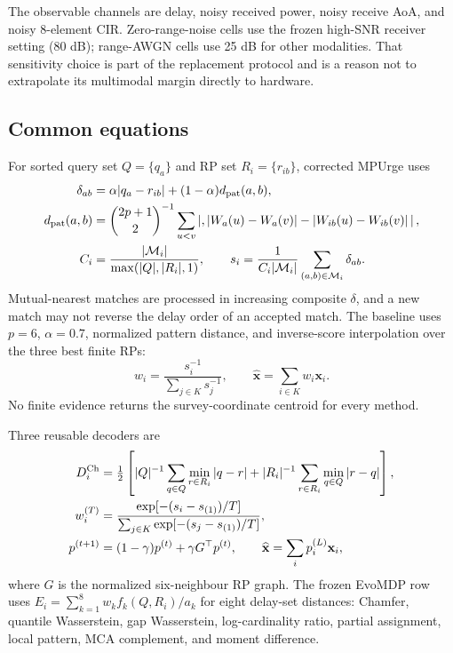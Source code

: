 \documentclass[10pt]{article}
\begin{document}
The observable channels are delay, noisy received power, noisy receive AoA,
and noisy 8-element CIR.  Zero-range-noise cells use the frozen high-SNR
receiver setting (80 dB); range-AWGN cells use 25 dB for other modalities.
That sensitivity choice is part of the replacement protocol and is a reason
not to extrapolate its multimodal margin directly to hardware.

\subsection{Common equations}

For sorted query set $Q=\{q_a\}$ and RP set $R_i=\{r_{ib}\}$, corrected
MPUrge uses
\begin{align}
 \delta_{ab}&=\alpha|q_a-r_{ib}|+(1-\alpha)d_{\rm pat}(a,b),\\
 d_{\rm pat}(a,b)&=\binom{2p+1}{2}^{-1}
 \sum_{u<v}\left|,|W_a(u)-W_a(v)|-|W_{ib}(u)-W_{ib}(v)|\,\right|,\\
 C_i&=\frac{|\mathcal M_i|}{\max(|Q|,|R_i|,1)},\qquad
 s_i=\frac{1}{C_i|\mathcal M_i|}\sum_{(a,b)\in\mathcal M_i}\delta_{ab}.
\end{align}
Mutual-nearest matches are processed in increasing composite $\delta$, and a
new match may not reverse the delay order of an accepted match.  The baseline
uses $p=6$, $\alpha=0.7$, normalized pattern distance, and inverse-score
interpolation over the three best finite RPs:
\begin{equation}
 w_i=\frac{s_i^{-1}}{\sum_{j\in K}s_j^{-1}},\qquad
 \widehat{\mathbf x}=\sum_{i\in K}w_i\mathbf x_i.
\end{equation}
No finite evidence returns the survey-coordinate centroid for every method.

Three reusable decoders are
\begin{align}
 D_i^{\rm Ch}&=\tfrac12\left[|Q|^{-1}\sum_{q\in Q}\min_{r\in R_i}|q-r|
 +|R_i|^{-1}\sum_{r\in R_i}\min_{q\in Q}|r-q|\right],\\
 w_i^{(T)}&=\frac{\exp[-(s_i-s_{(1)})/T]}
 {\sum_{j\in K}\exp[-(s_j-s_{(1)})/T]},\\
 p^{(t+1)}&=(1-\gamma)p^{(t)}+\gamma G^\top p^{(t)},\qquad
 \widehat{\mathbf x}=\sum_i p_i^{(L)}\mathbf x_i,
\end{align}
where $G$ is the normalized six-neighbour RP graph.  The frozen EvoMDP row
uses $E_i=\sum_{k=1}^8w_k f_k(Q,R_i)/a_k$ for eight delay-set distances:
Chamfer, quantile Wasserstein, gap Wasserstein, log-cardinality ratio, partial
assignment, local pattern, MCA complement, and moment difference.
\end{document}
